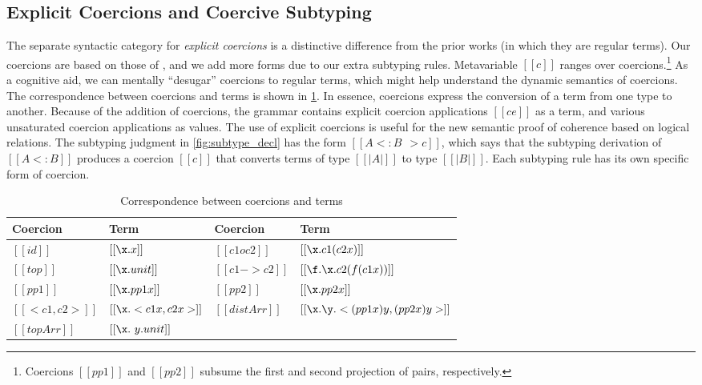 \subsection{Explicit Coercions and Coercive Subtyping}

The separate syntactic category for \textit{explicit coercions} is a distinctive difference
from the prior works (in which they are regular terms). Our coercions are based
on those of \citet{Henglein_1994}, and we add more forms due to our extra
subtyping rules.
Metavariable $[[c]]$ ranges over coercions.\footnote{Coercions $[[pp1]]$ and $[[pp2]]$ subsume the first and second projection of pairs, respectively.}
As a cognitive aid, we can mentally ``desugar'' coercions to
regular terms, which might help understand the dynamic semantics of coercions. The correspondence
between coercions and terms is shown in \cref{tab:coercion}.
In essence, coercions express the conversion
of a term from one type to another. Because of the addition of coercions, the
grammar contains explicit coercion applications $[[c e]]$ as a term, and various
unsaturated coercion applications as values. The use of explicit coercions is useful for the new semantic
proof of coherence based on logical relations.
The subtyping judgment in \cref{fig:subtype_decl} has the form $[[A <: B ~~> c]]$, which says that the
subtyping derivation of $[[A <: B]]$ produces a coercion $[[c]]$ that converts
terms of type $[[ |A| ]]$ to type $[[ |B| ]]$. Each subtyping rule has its own
specific form of coercion.


\begin{table}[t]
  \centering
\begin{tabular}{|l|l||l|l|}
\hline
\textbf{Coercion} & \textbf{Term} & \textbf{Coercion} & \textbf{Term} \\ \hline
$[[id]]$         & $[[ \x . x]]$  & $[[ c1 o c2  ]]$    &  $[[  \x . c1 (c2 x) ]]$     \\ \hline
$[[top]]$         & $[[ \x . unit ]]$  & $[[ c1 -> c2  ]]$    &  $[[  \f . \x . c2 (f (c1 x))  ]]$     \\ \hline
$[[  pp1   ]]$         & $[[ \x . pp1 x    ]]$  & $[[ pp2  ]]$    &  $[[  \x . pp2 x  ]]$     \\ \hline
$[[  < c1 , c2 >   ]]$         & $[[ \x . < c1 x, c2 x >    ]]$  & $[[ distArr  ]]$    &  $[[  \x . \y . < (pp1 x) y , (pp2 x) y > ]]$     \\ \hline
$[[  topArr   ]]$         & $[[ \x . \ y . unit    ]]$  &  & \\ \hline
\end{tabular}
  \caption{Correspondence between coercions and terms}
  \label{tab:coercion}
\end{table}



